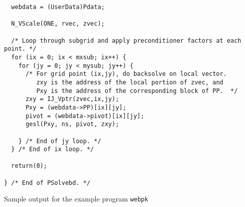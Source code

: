 \documentclass[11pt]{article}
\begin{document}
\begin{verbatim}
  webdata = (UserData)Pdata;

  N_VScale(ONE, rvec, zvec);

  /* Loop through subgrid and apply preconditioner factors at each point. */
  for (ix = 0; ix < mxsub; ix++) {
    for (jy = 0; jy < mysub; jy++) {
      /* For grid point (ix,jy), do backsolve on local vector. 
         zxy is the address of the local portion of zvec, and
         Pxy is the address of the corresponding block of PP.  */
      zxy = IJ_Vptr(zvec,ix,jy);
      Pxy = (webdata->PP)[ix][jy];
      pivot = (webdata->pivot)[ix][jy];
      gesl(Pxy, ns, pivot, zxy);

    } /* End of jy loop. */
  } /* End of ix loop. */

  return(0);

} /* End of PSolvebd. */

\end{verbatim}

\vspace*{.3in}

\normalsize

\noindent
Sample output for the example program {\tt webpk}
\end{document}
